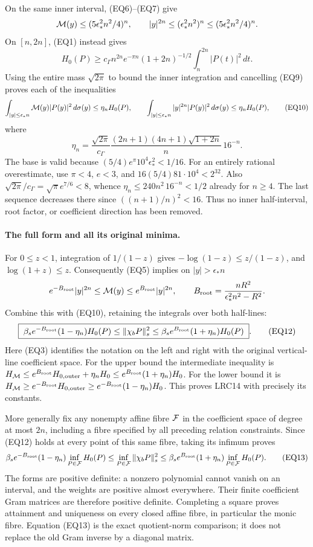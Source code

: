 On the same inner interval, (EQ6)--(EQ7) give
\[
 {\cal M}(y)\le(5\epsilon_*^2n^2/4)^n,\qquad
 |y|^{2n}\le(\epsilon_*^2n^2)^n
            \le(5\epsilon_*^2n^2/4)^n .
\]
On \([n,2n]\), (EQ1) instead gives
\[
 H_0(P)\ge
 c_\Gamma n^{2n}e^{-\pi n}(1+2n)^{-1/2}
       \int_n^{2n}|P(t)|^2\,dt .
\tag{EQ9}
\]
Using the entire mass \(\sqrt{2\pi}\) to bound the inner integration
and cancelling (EQ9) proves each of the inequalities
\[
 \int_{|y|\le\epsilon_*n}
       {\cal M}(y)|P(y)|^2\,d\sigma(y)\le\eta_nH_0(P),\qquad
 \int_{|y|\le\epsilon_*n}
       |y|^{2n}|P(y)|^2\,d\sigma(y)\le\eta_nH_0(P),
\tag{EQ10}
\]
where
\[
 \eta_n=\frac{\sqrt{2\pi}}{c_\Gamma}
 \frac{(2n+1)(4n+1)\sqrt{1+2n}}{n}\,16^{-n}.
\tag{EQ11}
\]
The base is valid because
\((5/4)e^\pi10^4\epsilon_*^2<1/16\).
For an entirely rational overestimate, use \(\pi<4\), \(e<3\), and
\(16(5/4)81\cdot10^4<2^{32}\).  Also
\(\sqrt{2\pi}/c_\Gamma=\sqrt\pi e^{7/6}<8\), whence
\(\eta_n\le240n^2\,16^{-n}<1/2\) already for \(n\ge4\).
The last sequence decreases there since \(((n+1)/n)^2<16\).
Thus no inner half-interval, root factor, or coefficient direction has
been removed.

\paragraph{The full form and all its original minima.}
For \(0\le z<1\), integration of \(1/(1-z)\) gives
\(-\log(1-z)\le z/(1-z)\), and \(\log(1+z)\le z\).
Consequently (EQ5) implies on \(|y|>\epsilon_*n\)
\[
 e^{-B_{\rm root}}|y|^{2n}\le{\cal M}(y)
       \le e^{B_{\rm root}}|y|^{2n},\qquad
 B_{\rm root}=\frac{nR^2}{\epsilon_*^2n^2-R^2}.
\]
Combine this with (EQ10), retaining the integrals over both half-lines:
\[
 \boxed{\;
 \beta_s e^{-B_{\rm root}}(1-\eta_n)H_0(P)
 \le \|\chi_bP\|_s^2
 \le \beta_s e^{B_{\rm root}}(1+\eta_n)H_0(P)
 \;}.
\tag{EQ12}
\]
Here (EQ3) identifies the notation on the left and right with the original
vertical-line coefficient space.  For the upper bound the intermediate
inequality is
\(H_{\cal M}\le e^{B_{\rm root}}H_{0,\mathrm{outer}}+\eta_nH_0
\le e^{B_{\rm root}}(1+\eta_n)H_0\).
For the lower bound it is
\(H_{\cal M}\ge e^{-B_{\rm root}}H_{0,\mathrm{outer}}
\ge e^{-B_{\rm root}}(1-\eta_n)H_0\).
This proves LRC14 with precisely its constants.

More generally fix any nonempty affine fibre \({\cal F}\) in the coefficient
space of degree at most \(2n\), including a fibre specified by all preceding
relation constraints.  Since (EQ12) holds at every point of this same
fibre, taking its infimum proves
\[
 \beta_s e^{-B_{\rm root}}(1-\eta_n)
       \inf_{P\in{\cal F}}H_0(P)
 \le\inf_{P\in{\cal F}}\|\chi_bP\|_s^2
 \le\beta_s e^{B_{\rm root}}(1+\eta_n)
       \inf_{P\in{\cal F}}H_0(P).
\tag{EQ13}
\]
The forms are positive definite: a nonzero polynomial cannot vanish on
an interval, and the weights are positive almost everywhere.  Their
finite coefficient Gram matrices are therefore positive definite.
Completing a square proves attainment and uniqueness on every closed
affine fibre, in particular the monic fibre.  Equation (EQ13) is the
exact quotient-norm comparison; it does not replace the old Gram inverse
by a diagonal matrix.

